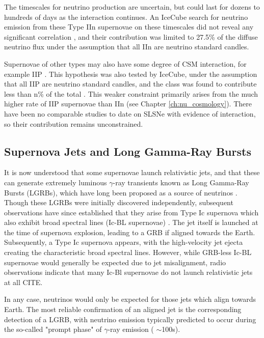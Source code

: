 The timescales for neutrino production are uncertain, but could last for dozens to hundreds of days as the interaction continues. An IceCube search for neutrino emission from these Type IIn supernovae on these timescales did not reveal any significant correlation , and their contribution was limited to 27.5\%  of the diffuse neutrino flux under the assumption that all IIn are neutrino standard candles. 

Supernovae of other types may also have some degree of CSM interaction, for example IIP . This hypothesis was also tested by IceCube, under the assumption that all IIP are neutrino standard candles, and the class was found to contribute less than n\% of the total \cite{Stasik2018Search}. This weaker constraint primarily arises from the much higher rate of IIP supernovae than IIn (see Chapter \ref{ch:nu_cosmology}). There have been no comparable studies to date on SLSNe with evidence of interaction, so their contribution remains unconstrained.

\subsection{Supernova Jets and Long Gamma-Ray Bursts}

It is now understood that some supernovae launch relativistic jets, and that these can generate extremely luminous $\gamma$-ray transients known as Long Gamma-Ray Bursts (LGRBs), which have long been proposed as a source of neutrinos . Though these LGRBs were initially discovered independently, subsequent observations have since established that they arise from Type Ic supernova which also exhibit broad spectral lines (Ic-BL supernovae) . The jet itself is launched at the time of supernova explosion, leading to a GRB if aligned towards the Earth. Subsequently, a Type Ic supernova appears, with the high-velocity jet ejecta creating the characteristic broad spectral lines. However, while GRB-less Ic-BL supernovae would generally be expected due to jet misalignment, radio observations indicate that many Ic-Bl supernovae do not launch relativistic jets at all CITE.

In any case, neutrinos would only be expected for those jets which align towards Earth. The most reliable confirmation of an aligned jet is the corresponding detection of a LGRB, with neutrino emission typically predicted to occur during the so-called "prompt phase" of $\gamma$-ray emission ( $\sim$100s). 


